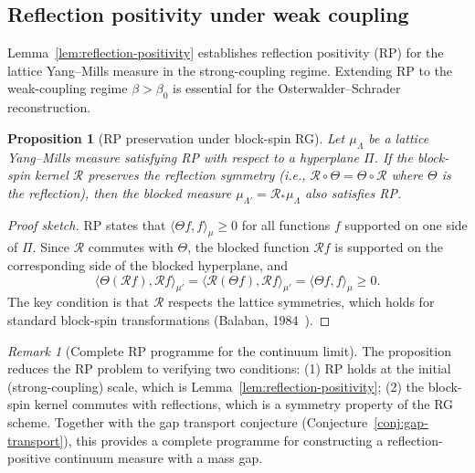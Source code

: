 \documentclass[12pt,a4paper]{article}
\theoremstyle{definition}
\theoremstyle{plain}
\newtheorem{proposition}[definition]{Proposition}
\theoremstyle{remark}
\newtheorem{remark}[definition]{Remark}
\begin{document}
\subsection{Reflection positivity under weak coupling}
\label{sec:rp-weak}

Lemma~\ref{lem:reflection-positivity} establishes reflection positivity (RP) for the lattice Yang--Mills measure in the strong-coupling regime. Extending RP to the weak-coupling regime $\beta > \beta_0$ is essential for the Osterwalder--Schrader reconstruction.

\begin{proposition}[RP preservation under block-spin RG]
\label{prop:rp-preservation}
Let $\mu_\Lambda$ be a lattice Yang--Mills measure satisfying RP with respect to a hyperplane $\Pi$. If the block-spin kernel $\mathcal{R}$ preserves the reflection symmetry (i.e., $\mathcal{R} \circ \Theta = \Theta \circ \mathcal{R}$ where $\Theta$ is the reflection), then the blocked measure $\mu_{\Lambda'} = \mathcal{R}_* \mu_\Lambda$ also satisfies RP.
\end{proposition}

\begin{proof}[Proof sketch]
RP states that $\langle \Theta f, f \rangle_{\mu} \geq 0$ for all functions $f$ supported on one side of $\Pi$. Since $\mathcal{R}$ commutes with $\Theta$, the blocked function $\mathcal{R} f$ is supported on the corresponding side of the blocked hyperplane, and
\[
\langle \Theta(\mathcal{R} f), \mathcal{R} f \rangle_{\mu'} = \langle \mathcal{R}(\Theta f), \mathcal{R} f \rangle_{\mu'} = \langle \Theta f, f \rangle_\mu \geq 0.
\]
The key condition is that $\mathcal{R}$ respects the lattice symmetries, which holds for standard block-spin transformations (Balaban, 1984~\cite{Balaban1985b}).
\end{proof}

\begin{remark}[Complete RP programme for the continuum limit]
The proposition reduces the RP problem to verifying two conditions: (1) RP holds at the initial (strong-coupling) scale, which is Lemma~\ref{lem:reflection-positivity}; (2) the block-spin kernel commutes with reflections, which is a symmetry property of the RG scheme. Together with the gap transport conjecture (Conjecture~\ref{conj:gap-transport}), this provides a complete programme for constructing a reflection-positive continuum measure with a mass gap.
\end{remark}

\end{document}
